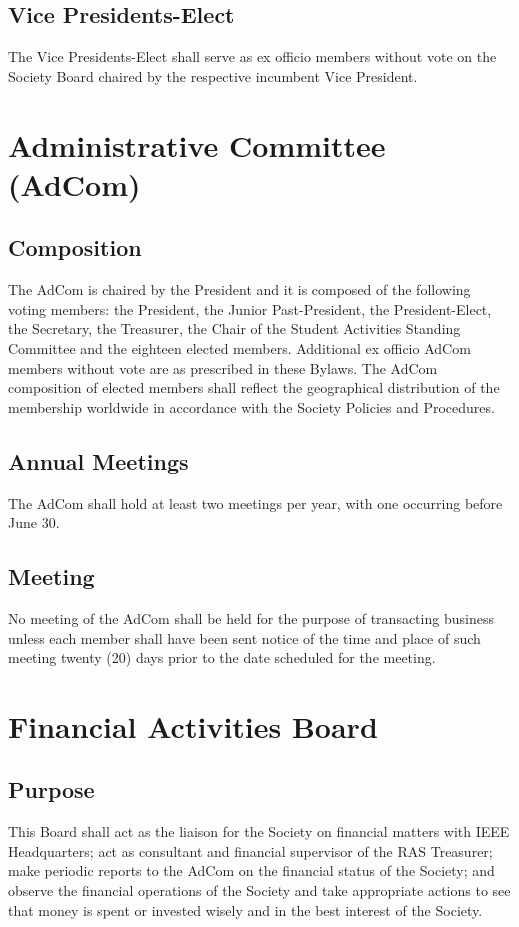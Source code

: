 \documentclass[10pt]{article}
\begin{document}
\subsection{Vice Presidents-Elect}

The Vice Presidents-Elect shall serve as ex officio members without vote on the Society Board chaired by the respective incumbent Vice President.


\section{Administrative Committee (AdCom)}
\label{AdCom}

\subsection{Composition}
\label{AdCom:Composition}

The AdCom is chaired by the President and it is composed of the following voting members: the President, the Junior Past-President, the President-Elect, the Secretary, the Treasurer, the Chair of the Student Activities Standing Committee and the eighteen elected members.  Additional ex officio AdCom members without vote are as prescribed in these Bylaws. The AdCom composition of elected members shall reflect the geographical distribution of the membership worldwide in accordance with the Society Policies and Procedures.


\subsection{Annual Meetings}
The AdCom shall hold at least two meetings per year,  with one occurring before June 30.


\subsection{Meeting}

No meeting of the AdCom shall be held for the purpose of transacting business unless each member shall have been sent notice of the time and place of such meeting twenty (20) days prior to the date scheduled for the meeting. 


\section{Financial Activities Board}
\label{FAB}

\subsection{Purpose}
This Board shall act as the liaison for the Society on financial matters with IEEE Headquarters; act as consultant and financial supervisor of the RAS Treasurer; make periodic reports to the AdCom on the financial status of the Society; and observe the financial operations of the Society and take appropriate actions to see that money is spent or invested wisely and in the best interest of the Society.
\end{document}
